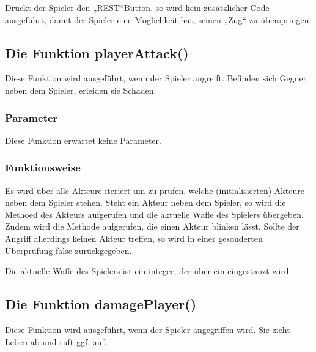 \documentclass[letterpaper,10pt,ngerman]{sphinxmanual}
\begin{document}
Drückt der Spieler den „REST“\sphinxhyphen{}Button, so wird kein zusätzlicher Code
ausgeführt, damit der Spieler eine Möglichkeit hat, seinen „Zug“ zu
überspringen.


\subsection{Die Funktion playerAttack()}
\label{\detokenize{programming:die-funktion-playerattack}}
Diese Funktion wird ausgeführt, wenn der Spieler angreift. Befinden sich Gegner
neben dem Spieler, erleiden sie Schaden.


\subsubsection{Parameter}
\label{\detokenize{programming:id21}}
Diese Funktion erwartet keine Parameter.


\subsubsection{Funktionsweise}
\label{\detokenize{programming:id22}}
Es wird über alle Akteure iteriert um
zu prüfen, welche (initialisierten) Akteure neben dem Spieler stehen. Steht ein
Akteur neben dem Spieler, so wird die Methoed  des Akteurs
aufgerufen und die aktuelle Waffe des Spielers  übergeben.
Zudem wird die Methode  aufgerufen, die einen Akteur blinken lässt.
Sollte der Angriff allerdings
keinen Akteur treffen, so wird in einer gesonderten Überprüfung false
zurückgegeben.

Die aktuelle Waffe des Spielers ist ein integer, der über ein 
eingestanzt wird:
\begin{quote}

\begin{sphinxVerbatim}[commandchars=\\\{\}]
\end{sphinxVerbatim}
\end{quote}


\subsection{Die Funktion damagePlayer()}
\label{\detokenize{programming:die-funktion-damageplayer}}
Diese Funktion wird ausgeführt, wenn der Spieler angegriffen wird. Sie zieht
Leben ab und ruft ggf.  auf.
\end{document}

